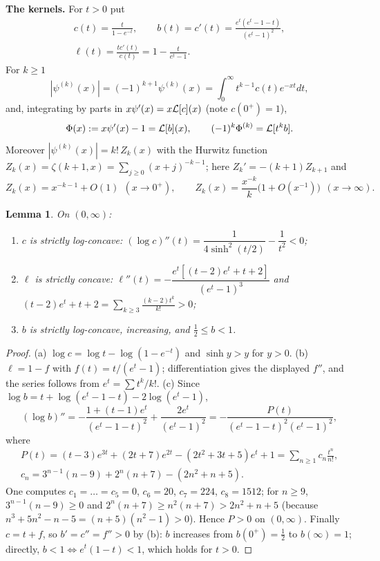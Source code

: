 \documentclass[11pt]{amsart}
\newtheorem{lemma}[theorem]{Lemma}
\theoremstyle{definition}
\theoremstyle{remark}
\begin{document}
\noindent\textbf{The kernels.} For $t>0$ put
\begin{gather*}
 c(t)=\frac{t}{1-e^{-t}},\qquad
 b(t)=c'(t)=\frac{e^t(e^t-1-t)}{(e^t-1)^2},\\
 \ell(t)=\frac{tc'(t)}{c(t)}=1-\frac{t}{e^t-1}.
\end{gather*}
For $k\ge1$ \cite[5.15.1]{R2-DLMF}
\begin{equation}\label{R2:eq:psirep}
 |\psi^{(k)}(x)|=(-1)^{k+1}\psi^{(k)}(x)=\int_0^\infty t^{k-1}c(t)e^{-xt}dt ,
\end{equation}
and, integrating by parts in $x\psi'(x)=x\mathcal{L}[c](x)$ (note $c(0^+)=1$),
\begin{equation}\label{R2:eq:Phirep}
 \Phi(x):=x\psi'(x)-1=\mathcal{L}[b](x),\qquad (-1)^k\Phi^{(k)}=\mathcal{L}[t^kb].
\end{equation}
Moreover $|\psi^{(k)}(x)|=k!\,Z_k(x)$ with the Hurwitz function
$Z_k(x)=\zeta(k+1,x)=\sum_{j\ge0}(x+j)^{-k-1}$; here $Z_k'=-(k+1)Z_{k+1}$ and
\cite[25.11.43]{R2-DLMF}
\begin{equation}\label{R2:eq:Zasy}
 Z_k(x)=x^{-k-1}+O(1)\ \ (x\to0^+),\qquad
 Z_k(x)=\frac{x^{-k}}{k}\bigl(1+O(x^{-1})\bigr)\ \ (x\to\infty).
\end{equation}

\begin{lemma}\label{R2:lem:kernels}
On $(0,\infty)$:
\begin{enumerate}
\item[(a)] $c$ is strictly log-concave:
 $(\log c)''(t)=\dfrac{1}{4\sinh^2(t/2)}-\dfrac1{t^2}<0$;
\item[(b)] $\ell$ is strictly concave:
 $\ell''(t)=-\dfrac{e^t[(t-2)e^t+t+2]}{(e^t-1)^3}$ and
 $(t-2)e^t+t+2=\sum_{k\ge3}\frac{(k-2)t^k}{k!}>0$;
\item[(c)] $b$ is strictly log-concave, increasing, and $\tfrac12\le b<1$.
\end{enumerate}
\end{lemma}
\begin{proof}
(a) $\log c=\log t-\log(1-e^{-t})$ and $\sinh y>y$ for $y>0$.
(b) $\ell=1-f$ with $f(t)=t/(e^t-1)$; differentiation gives the displayed
$f''$, and the series follows from $e^t=\sum t^k/k!$.
(c) Since $\log b=t+\log(e^t-1-t)-2\log(e^t-1)$,
\[
 (\log b)''=-\frac{1+(t-1)e^t}{(e^t-1-t)^2}+\frac{2e^t}{(e^t-1)^2}
 =-\frac{P(t)}{(e^t-1-t)^2(e^t-1)^2},
\]
where
\begin{gather*}
 P(t)=(t-3)e^{3t}+(2t+7)e^{2t}-(2t^2+3t+5)e^t+1=\sum_{n\ge1}c_n\frac{t^n}{n!},\\
 c_n=3^{n-1}(n-9)+2^n(n+7)-(2n^2+n+5).
\end{gather*}
One computes $c_1=\dots=c_5=0$, $c_6=20$, $c_7=224$, $c_8=1512$; for
$n\ge9$, $3^{n-1}(n-9)\ge0$ and $2^n(n+7)\ge n^2(n+7)>2n^2+n+5$ (because
$n^3+5n^2-n-5=(n+5)(n^2-1)>0$). Hence $P>0$ on $(0,\infty)$. Finally
$c=t+f$, so $b'=c''=f''>0$ by (b): $b$ increases from $b(0^+)=\frac12$ to
$b(\infty)=1$; directly, $b<1\iff e^t(1-t)<1$, which holds for $t>0$.
\end{proof}
\end{document}
